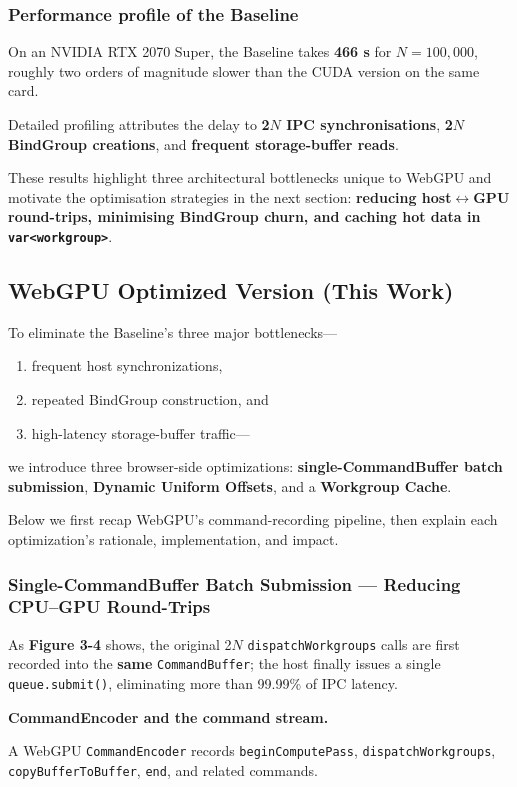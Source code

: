 \documentclass[12pt]{report}
\begin{document}
\subsubsection{Performance profile of the Baseline}
On an NVIDIA RTX 2070 Super, the Baseline takes \textbf{466 s} for $N=100,000$, roughly two orders of magnitude slower than the CUDA version on the same card.

Detailed profiling attributes the delay to \textbf{2$N$ IPC synchronisations}, \textbf{2$N$ BindGroup creations}, and \textbf{frequent storage-buffer reads}.

These results highlight three architectural bottlenecks unique to WebGPU and motivate the optimisation strategies in the next section: \textbf{reducing host$\leftrightarrow$GPU round-trips, minimising BindGroup churn, and caching hot data in \texttt{var<workgroup>}}.

\subsection{WebGPU Optimized Version (This Work)}
To eliminate the Baseline’s three major bottlenecks—
\begin{enumerate}
    \item frequent host synchronizations,
    \item repeated BindGroup construction, and
    \item high-latency storage-buffer traffic—
\end{enumerate}
we introduce three browser-side optimizations: \textbf{single-CommandBuffer batch submission}, \textbf{Dynamic Uniform Offsets}, and a \textbf{Workgroup Cache}.

Below we first recap WebGPU’s command-recording pipeline, then explain each optimization’s rationale, implementation, and impact.

\subsubsection{Single-CommandBuffer Batch Submission — Reducing CPU–GPU Round-Trips}
As \textbf{Figure 3-4} shows, the original 2$N$ \texttt{dispatchWorkgroups} calls are first recorded into the \textbf{same} \texttt{CommandBuffer}; the host finally issues a single \texttt{queue.submit()}, eliminating more than 99.99\% of IPC latency.

\textbf{CommandEncoder and the command stream.}

A WebGPU \texttt{CommandEncoder} records \texttt{beginComputePass}, \texttt{dispatchWorkgroups}, \texttt{copyBufferToBuffer}, \texttt{end}, and related commands.
\end{document}
